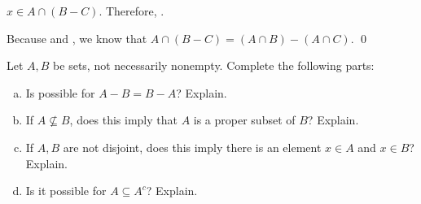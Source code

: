 \documentclass[11pt,letterpaper]{article}
\newcommand{\blank}[1]{\underline{\hspace{#1}}} %
\begin{document}
$x \in A \cap (B - C)$. Therefore, \blank{3cm}. 

Because \blank{3cm} and \blank{3cm}, we know that $A \cap (B - C)= (A \cap B) - (A \cap C)$. \qed



\newpage



 Let $A, B$ be sets, not necessarily nonempty. Complete the following parts:
	\begin{enumerate}[(a)]
	\item Is possible for $A - B= B - A$? Explain. 
	\item If $A \not\subseteq B$, does this imply that $A$ is a proper subset of $B$? Explain. 
	\item If $A, B$ are not disjoint, does this imply there is an element $x \in A$ and $x \in B$? Explain.
	\item Is it possible for $A \subseteq A^c$? Explain. 
	\end{enumerate}
\end{document}
